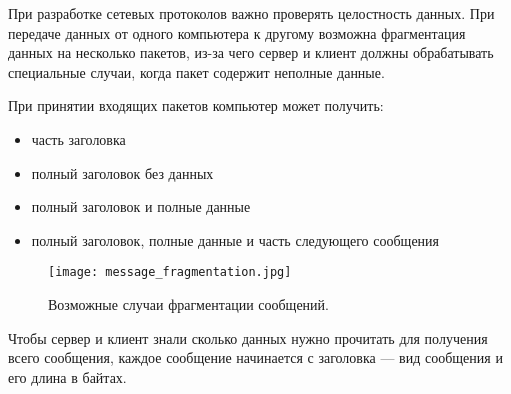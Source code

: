При разработке сетевых протоколов важно проверять целостность данных. При передаче данных от одного компьютера
к другому возможна фрагментация данных на несколько пакетов, из-за чего сервер и клиент должны обрабатывать
специальные случаи, когда пакет содержит неполные данные.

При принятии входящих пакетов компьютер может получить:

\begin{itemize}
	\item часть заголовка
	\item полный заголовок без данных
	\item полный заголовок и полные данные
	\item полный заголовок, полные данные и часть следующего сообщения
\end{itemize}

\begin{figure}[H]
	\begin{center}
		\texttt{[image: message\_fragmentation.jpg]}
		\caption{Возможные случаи фрагментации сообщений.}
	\end{center}
\end{figure}

Чтобы сервер и клиент знали сколько данных нужно прочитать для получения всего сообщения,
каждое сообщение начинается с заголовка — вид сообщения и его длина в байтах.
